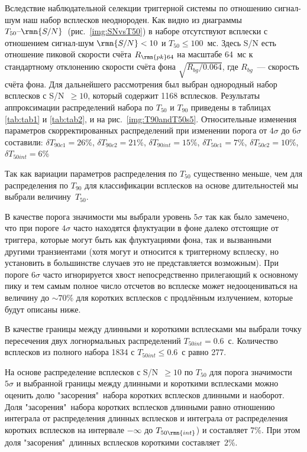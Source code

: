 Вследствие наблюдательной селекции триггерной системы по отношению сигнал-шум 
наш набор всплесков неоднороден. Как видно из диаграммы $T_{50}\textrm{--}\rmn{S/N}$~(рис.~\ref{img:SNvsT50}) 
в наборе отсутствуют всплески с отношением сигнал-шум $\rmn{S/N} < 10$ и $T_{50} \leq 100$~мс. 
Здесь S/N есть отношение пиковой скорости счёта $R_{\rmn{pk}64}$ на масштабе 64~мс 
к стандартному отклонению скорости счёта фона $\sqrt{R_{bg}/0.064}$, 
где $R_{bg}$~--- скорость счёта фона. Для дальнейшего рассмотрения был выбран 
однородный набор всплесков с S/N~$\geq 10$, который содержит 1168 всплесков. 
Результаты аппроксимации распределений набора по $T_{50}$ и $T_{90}$ приведены в 
таблицах \ref{tab:tab1} и \ref{tab:tab2}, и на рис.~\ref{img:T90andT50s5}. 
Относительные изменения параметров скорректированных распределений при изменении 
порога от $4\sigma$ до $6\sigma$ составили: 
$\delta T_{90c1} = 26$\%, $\delta T_{90c2} = 21$\%, $\delta T_{90int} = 15$\%, 
$\delta T_{50c1} = 7$\%, $\delta T_{50c2} = 10$\%, $\delta T_{50int} = 6$\%

Так как вариации параметров распределения по $T_{50}$ существенно меньше, 
чем для распределения по $T_{90}$ для классификации всплесков на основе длительностей 
мы выбрали величину~$T_{50}$. 

В качестве порога значимости мы выбрали уровень $5\sigma$ так как было замечено, 
что при пороге $4\sigma$ часто находятся флуктуации в фоне далеко отстоящие от 
триггера, которые могут быть как флуктуациями фона, так и вызванными другими 
транзиентами (хотя могут и относится к триггерному всплеску, но установить в 
большинстве случаев это не представляется возможным). При пороге $6\sigma$ часто 
игнорируется хвост непосредственно прилегающий к основному пику и тем самым полное 
число отсчетов во всплеске может недооцениваться на величину до $\sim 70$\% 
для коротких всплесков с продлённым излучением, которые будут описаны ниже.

В качестве границы между длинными и короткими всплесками мы выбрали точку пересечения 
двух логнормальных распределений $T_{50int} = 0.6$~с. Количество всплесков из полного 
набора 1834 с $T_{50int} \leq 0.6$~с равно 277. 

На основе распределение всплесков с S/N~$\geq 10$ по $T_{50}$ для порога 
значимости $5\sigma$ и выбранной границы между длинными и короткими всплесками 
можно оценить долю "засорения"\ набора коротких всплесков длинными и наоборот. 
Доля "засорения"\ набора коротких всплесков длинными равно отношению интеграла 
от распределения длинных всплесков и интеграла от распределения коротких всплесков 
на интервале $-\infty$ до $T_{50\rmn{int}}$) и составляет 7\%. При этом доля "засорения"\ 
длинных всплесков короткими составляет~2\%.

